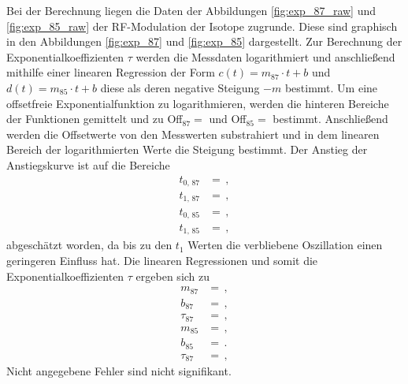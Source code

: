 Bei der Berechnung liegen die Daten der Abbildungen \ref{fig:exp_87_raw} und \ref{fig:exp_85_raw} der RF-Modulation der Isotope zugrunde.
Diese sind graphisch in den Abbildungen \ref{fig:exp_87} und \ref{fig:exp_85} dargestellt.
Zur Berechnung der Exponentialkoeffizienten $\tau$ werden die Messdaten logarithmiert und anschließend mithilfe einer linearen Regression der Form $c(t)=m_\text{87} \cdot t + b$ und $d(t)=m_\text{85} \cdot t + b$ diese als deren negative Steigung $-m$ bestimmt.
Um eine offsetfreie Exponentialfunktion zu logarithmieren, werden die hinteren Bereiche der Funktionen gemittelt und zu Off$_\text{87} = $ und Off$_\text{85} = $ bestimmt.
Anschließend werden die Offsetwerte von den Messwerten substrahiert und in dem linearen Bereich der logarithmierten Werte die Steigung bestimmt.
Der Anstieg der Anstiegskurve ist auf die Bereiche
\begin{align*}
    t_\text{0, 87} &=  \,,\\
    t_\text{1, 87} &=  \,,\\
    t_\text{0, 85} &=  \,,\\
    t_\text{1, 85} &=  \,,
\end{align*}
abgeschätzt worden, da bis zu den $t_\text{1}$ Werten die verbliebene Oszillation einen geringeren Einfluss hat.
Die linearen Regressionen und somit die Exponentialkoeffizienten $\tau$ ergeben sich zu
\begin{align*}
    m_\text{87} &=  \,,\\
    b_\text{87} &=  \,,\\
    \tau_\text{87} &=  \,,\\
    m_\text{85} &=  \,,\\
    b_\text{85} &=  \,.\\
    \tau_\text{87} &=  \,,
\end{align*}
Nicht angegebene Fehler sind nicht signifikant.

